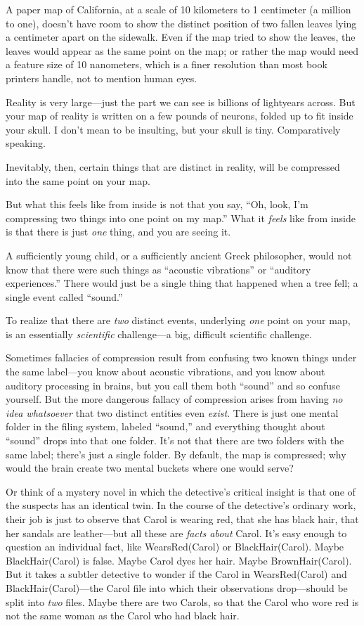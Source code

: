 {
 A paper map of California, at a scale of 10 kilometers to 1
centimeter (a million to one), doesn't have room to
show the distinct position of two fallen leaves lying a centimeter
apart on the sidewalk. Even if the map tried to show the leaves, the
leaves would appear as the same point on the map; or rather the map
would need a feature size of 10 nanometers, which is a finer resolution
than most book printers handle, not to mention human eyes.}

{
 Reality is very large---just the part we can see is billions of
lightyears across. But your map of reality is written on a few pounds
of neurons, folded up to fit inside your skull. I don't
mean to be insulting, but your skull is tiny. Comparatively speaking.}

{
 Inevitably, then, certain things that are distinct in reality,
will be compressed into the same point on your map.}

{
 But what this feels like from inside is not that you say,
``Oh, look, I'm compressing two things
into one point on my map.'' What it \textit{feels}
like from inside is that there is just \textit{one} thing, and you are
seeing it.}

{
 A sufficiently young child, or a sufficiently ancient Greek
philosopher, would not know that there were such things as
``acoustic vibrations'' or
``auditory experiences.'' There
would just be a single thing that happened when a tree fell; a single
event called ``sound.''}

{
 To realize that there are \textit{two} distinct events, underlying
\textit{one} point on your map, is an essentially \textit{scientific}
challenge---a big, difficult scientific challenge.}

{
 Sometimes fallacies of compression result from confusing two known
things under the same label---you know about acoustic vibrations, and
you know about auditory processing in brains, but you call them both
``sound'' and so confuse yourself.
But the more dangerous fallacy of compression arises from having
\textit{no idea whatsoever} that two distinct entities even
\textit{exist}. There is just one mental folder in the filing system,
labeled ``sound,'' and everything
thought about ``sound'' drops into
that one folder. It's not that there are two folders
with the same label; there's just a single folder. By
default, the map is compressed; why would the brain create two mental
buckets where one would serve?}

{
 Or think of a mystery novel in which the
detective's critical insight is that one of the
suspects has an identical twin. In the course of the
detective's ordinary work, their job is just to observe
that Carol is wearing red, that she has black hair, that her sandals
are leather---but all these are \textit{facts about} Carol.
It's easy enough to question an individual fact, like
WearsRed(Carol) or BlackHair(Carol). Maybe BlackHair(Carol) is false.
Maybe Carol dyes her hair. Maybe BrownHair(Carol). But it takes a
subtler detective to wonder if the Carol in WearsRed(Carol) and
BlackHair(Carol)---the Carol file into which their observations
drop---should be split into \textit{two} files. Maybe there are two
Carols, so that the Carol who wore red is not the same woman as the
Carol who had black hair.}

